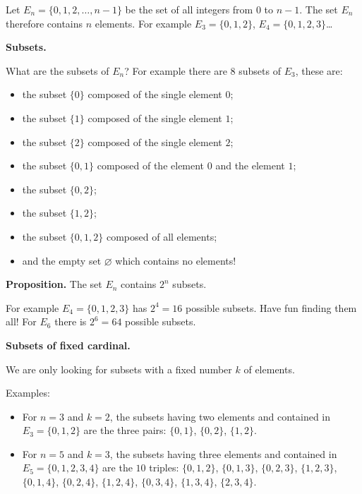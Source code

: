 \documentclass[11pt,class=report,crop=false]{standalone}
\begin{document}
\begin{cours}[Subsets]

Let $E_n = \{0,1,2,\ldots,n-1\}$ be the set of all integers from $0$ to $n-1$. The set $E_n$ therefore contains $n$ elements.
For example $E_3 = \{ 0,1,2 \}$, $E_4 = \{ 0,1,2,3 \}$\ldots

\bigskip

\textbf{Subsets.}

What are the subsets of $E_n$? For example there are $8$ subsets of $E_3$, these are:
    \begin{itemize}
      \item the subset $\{0\}$ composed of the single element $0$;
      \item the subset $\{1\}$ composed of the single element $1$;      
      \item the subset $\{2\}$ composed of the single element $2$; 
      \item the subset $\{0,1\}$ composed of the element $0$ and the element $1$;           
      \item the subset $\{0,2\}$;
      \item the subset $\{1,2\}$; 
      \item the subset $\{0, 1,2\}$ composed of all elements;
      \item and the empty set $\varnothing$ which contains no elements!    
    \end{itemize} 

\medskip

\textbf{Proposition.} The set $E_n$ contains $2^n$ subsets.

\medskip

For example $E_4 = \{ 0,1,2,3 \}$ has $2^4 = 16$ possible subsets. Have fun finding them all! For $E_6$ there is $2^6 = 64$ possible subsets.

\bigskip

\textbf{Subsets of fixed cardinal.}

We are only looking for subsets with a fixed number $k$ of elements.

Examples:
\begin{itemize}
  \item For $n = 3$ and $k = 2$, the subsets having two elements and contained in $E_3 = \{ 0,1,2 \}$ are the three pairs: $\{0,1\}$, $\{0,2\}$, $\{1,2\}$.

  \item For $n = 5$ and $k = 3$, the subsets having three elements and contained in $E_5 = \{ 0,1,2,3,4 \}$ are the $10$ triples:
  $\{0, 1, 2\}$, $\{0, 1, 3\}$, $\{0, 2, 3\}$, $\{1, 2, 3\}$, $\{0, 1, 4\}$, $\{0, 2, 4\}$, $\{1, 2, 4\}$, $\{0, 3, 4\}$, $\{1, 3, 4\}$, $\{2, 3, 4\}$.
  
\end{itemize}

\end{cours}
\end{document}
